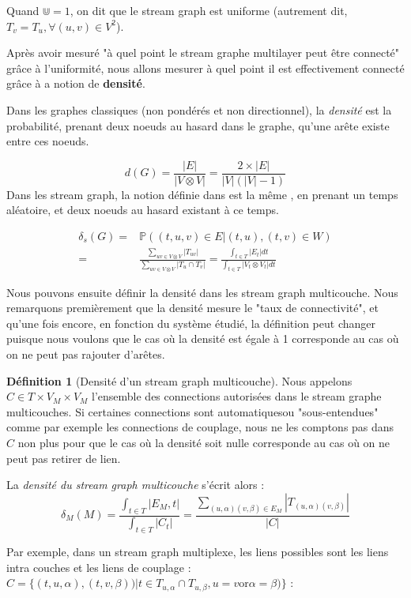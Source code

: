\documentclass[11pt,a4paper]{article}
\theoremstyle{definition}
\newtheorem{defn}{Définition}
\theoremstyle{remark}
\theoremstyle{remark}
\def \stg {stream graph}
\def \stgm {stream graph multicouche}
\begin{document}
	Quand $\Cup=1$, on dit que le stream graph est uniforme (autrement dit, $T_v = T_u, \forall (u,v) \in V^2$).


    Après avoir mesuré "à quel point le stream graphe multilayer peut être connecté" grâce à l'uniformité, nous allons mesurer à quel point il est effectivement connecté grâce à a notion de \textbf{densité}.
    
    Dans les graphes classiques (non pondérés et non directionnel), la {\em densité} est la probabilité, prenant deux noeuds au hasard dans le graphe, qu'une arête existe entre ces noeuds.
    
		\[
			d(G) = \frac{|E|}{|V\otimes V|} = \frac{2\times |E|}{|V|(|V|-1)}
		\]
	Dans les \stg{}, la notion définie dans \cite{stream} est la même , en prenant un temps aléatoire, et deux noeuds au hasard existant à ce temps. 	

		\begin{align*}
			\delta_s(G) = & \mathbb{P}((t,u,v)\in E| (t,u),(t,v) \in W) \\
			 =  & \frac{\sum_{uv \in V \otimes V}{|T_{uv}|}}{\sum_{uv \in V\otimes V}{|T_u\cap T_v|}}= \frac{\int_{t\in T}{|E_t|dt}}{\int_{t\in T}{|V_t\otimes V_t|dt}}
		\end{align*}
		
	Nous pouvons ensuite définir la densité dans les \stgm{}. Nous remarquons premièrement que la densité mesure le "taux de connectivité", et qu'une fois encore, en fonction du système étudié, la définition peut changer puisque nous voulons que le cas où la densité est égale à 1 corresponde au cas où on ne peut pas rajouter d'arêtes. 

\begin{defn}[Densité d'un \stgm{}]	
	Nous appelons  $C \in T \times V_M\times V_M$ l'ensemble des connections autorisées dans le stream graphe multicouches. Si certaines connections sont \og automatiques\fg ou "sous-entendues" comme par exemple les connections de couplage, nous ne les comptons pas dans $C$ non plus pour que le cas où la densité soit nulle corresponde au cas où on ne peut pas retirer de lien.

	La {\em densité du \stgm{}} s'écrit alors : 
	\[
		\delta_M (M) 
		= \frac{\int_{t\in T}|E_M,t|}{\int_{t\in T}|C_t|} 
		= \frac{\sum_{(u,\alpha)(v,\beta) \in E_M}|T_{(u,\alpha)(v,\beta)}|}{|C|}
	\]
\end{defn}	
	
	Par exemple, dans un \stg{} multiplexe, les liens possibles sont les liens intra couches et les liens de couplage : $C=\{(t,u,\alpha),(t,v,\beta))| t\in T_{u,\alpha} \cap T_{u,\beta}, u=v \text{or} \alpha = \beta)\}$ :
\end{document}
